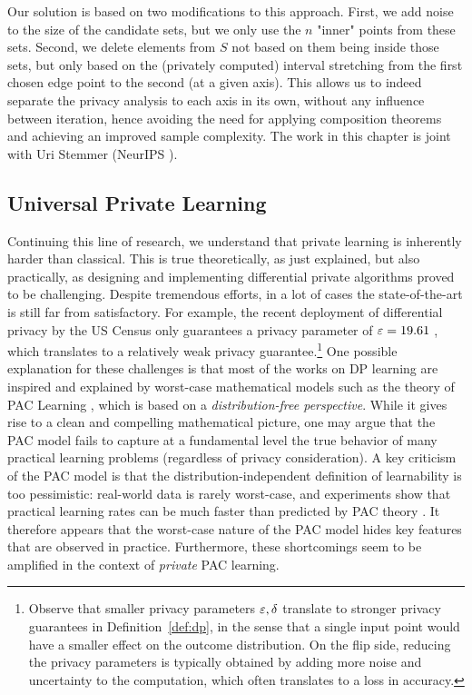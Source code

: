 \documentclass[12pt,a4paper,oneside,onecolumn]{book}
\begin{document}
Our solution is based on two modifications to this approach.
First, we add noise to the size of the candidate sets, but we only use the $n$ "inner" points from these sets. 
Second, we delete elements from $S$ not based on them being inside those sets, but only based on the (privately computed) interval stretching from the first chosen edge point to the second (at a given axis). 
This allows us to indeed separate the privacy analysis to each axis in its own, without any influence between iteration, hence avoiding the need for applying composition theorems and achieving an improved sample complexity.
The work in this chapter is joint with Uri Stemmer (NeurIPS \citeyear{NEURIPS2021_ee0e9524}).

\subsection{Universal Private Learning}
Continuing this line of research, we understand that private learning is inherently harder than classical. This is true theoretically, as just explained, but also practically, as designing and implementing differential private algorithms proved to be challenging. Despite tremendous efforts, in a lot of cases the state-of-the-art is still far from satisfactory. 
For example, the recent deployment of differential privacy by the US Census only guarantees a privacy parameter of $\varepsilon= 19.61$ \citep{bureau_2021}, 
which translates to a relatively weak privacy guarantee.\footnote{Observe that smaller privacy parameters $\varepsilon,\delta$ translate to stronger privacy guarantees in Definition~\ref{def:dp}, in the sense that a single input point would have a smaller effect on the outcome distribution. On the flip side, reducing the privacy parameters is typically obtained by adding more noise and uncertainty to the computation, which often translates to a loss in accuracy.}
One possible explanation for these challenges is that most of the works on DP learning are inspired and explained by {worst-case} mathematical models such as the theory of PAC Learning \citep{valiant1984theory}, which is based on a {\em distribution-free perspective}. While it gives rise to a clean and compelling mathematical picture, one may argue that the PAC
model fails to capture at a fundamental level the true behavior of many practical learning problems (regardless of privacy consideration). A key criticism of the PAC model is that the distribution-independent definition of learnability is too pessimistic: real-world data is rarely worst-case, and experiments show that practical learning rates can be much faster than predicted by PAC theory \citep{CohnT90,CohnT92}. It therefore appears that the worst-case nature of the PAC model hides key features that are observed in practice. Furthermore, these shortcomings seem to be amplified in the context of {\em private} PAC learning.
\end{document}
